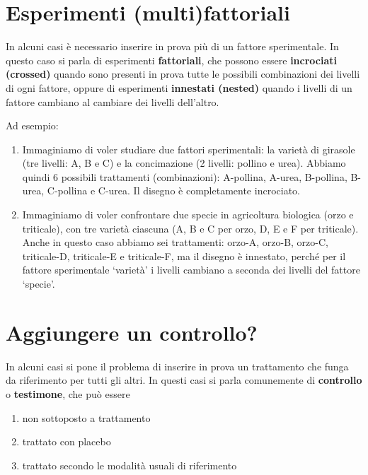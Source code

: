 \documentclass[a4paper,12pt,oneside]{book}
\providecommand{\tightlist}{%
  \setlength{\itemsep}{0pt}\setlength{\parskip}{0pt}}
\theoremstyle{definition}
\theoremstyle{definition}
\theoremstyle{definition}
\theoremstyle{remark}
\begin{document}
\section{Esperimenti
(multi)fattoriali}\label{esperimenti-multifattoriali}

In alcuni casi è necessario inserire in prova più di un fattore
sperimentale. In questo caso si parla di esperimenti
\textbf{fattoriali}, che possono essere \textbf{incrociati (crossed)}
quando sono presenti in prova tutte le possibili combinazioni dei
livelli di ogni fattore, oppure di esperimenti \textbf{innestati
(nested)} quando i livelli di un fattore cambiano al cambiare dei
livelli dell'altro.

Ad esempio:

\begin{enumerate}
\def\labelenumi{\arabic{enumi}.}
\tightlist
\item
  Immaginiamo di voler studiare due fattori sperimentali: la varietà di
  girasole (tre livelli: A, B e C) e la concimazione (2 livelli: pollino
  e urea). Abbiamo quindi 6 possibili trattamenti (combinazioni):
  A-pollina, A-urea, B-pollina, B-urea, C-pollina e C-urea. Il disegno è
  completamente incrociato.
\item
  Immaginiamo di voler confrontare due specie in agricoltura biologica
  (orzo e triticale), con tre varietà ciascuna (A, B e C per orzo, D, E
  e F per triticale). Anche in questo caso abbiamo sei trattamenti:
  orzo-A, orzo-B, orzo-C, triticale-D, triticale-E e triticale-F, ma il
  disegno è innestato, perché per il fattore sperimentale `varietà' i
  livelli cambiano a seconda dei livelli del fattore `specie'.
\end{enumerate}

\section{Aggiungere un controllo?}\label{aggiungere-un-controllo}

In alcuni casi si pone il problema di inserire in prova un trattamento
che funga da riferimento per tutti gli altri. In questi casi si parla
comunemente di \textbf{controllo} o \textbf{testimone}, che può essere

\begin{enumerate}
\def\labelenumi{\arabic{enumi}.}
\tightlist
\item
  non sottoposto a trattamento
\item
  trattato con placebo
\item
  trattato secondo le modalità usuali di riferimento
\end{enumerate}
\end{document}

